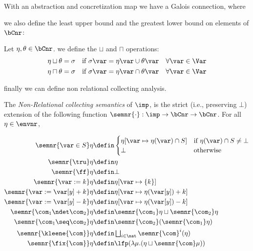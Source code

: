 With an abstraction and concretization map we have a Galois
connection, where 

we also define the least upper bound and the greatest lower bound on
elements of \(\bCnr\):

\begin{definition}
  Let \(\eta,\theta \in \bCnr\). we define the \(\sqcup\) and
  \(\sqcap\) operations:
  \begin{align*}
    \eta \sqcup \theta & = \sigma & \text{if } \sigma\var = \eta\var \cup \theta\var \quad \forall \var \in \Var \\
    \eta \sqcap \theta & = \sigma & \text{if } \sigma\var = \eta\var \cap \theta\var \quad \forall \var \in \Var \\
  \end{align*}
\end{definition}

finally we can define non relational collecting analysis.

\begin{definition}\label{def:nonrel}
  The \emph{Non-Relational collecting semantics} of \(\imp\), is the
  strict (i.e., preserving \(\bot\))
  extension of the following function \(\semnr{\cdot}: \imp \to
  \bCnr \to \bCnr\). For all \(\eta \in \envnr\),

  \begin{align*}
    \semnr{\var \in S}\eta 
    & \defin  
      \begin{cases}
        \eta[\var \mapsto \eta(\var)\cap S] & \text{if }\eta(\var)\cap S\neq \bot \\ \bot & \text{otherwise}
      \end{cases}\\
    \semnr{\tru}\eta 
    & \defin \eta\\
    \semnr{\ff}\eta 
    & \defin \bot\\
    \semnr{\var := k}\eta 
    & \defin \eta[\var \mapsto \{k\}]\\
    \semnr{\var := \var[y] + k}\eta 
    & \defin \eta[\var \mapsto \eta (\var[y]) + k]\\
    \semnr{\var := \var[y] - k}\eta 
    & \defin \eta[\var \mapsto \eta (\var[y]) - k]\\
    \semnr{\com_1 \ndet \com_2} \eta
    & \defin \semnr{\com_1} \eta \sqcup \semnr{\com_2} \eta\\
    \semnr{\com_1 \seq \com_2} \eta
    & \defin \semnr{\com_2} (\semnr{\com_1} \eta)\\
    \semnr{\kleene{\com}} \eta
    & \defin \textstyle \bigsqcup_{i \in \nat} \semnr{\com}^i (\eta)\\
    \semnr{\fix{\com}} \eta
    & \defin  \lfp(\lambda \mu. (\eta \sqcup \semnr{\com} \mu))
  \end{align*}
\end{definition}
